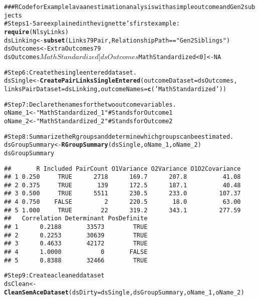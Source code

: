 \documentclass[letterpaper]{article}\usepackage{graphicx, color}
\makeatletter
\newcommand{\hlfunctioncall}[1]{\textcolor[rgb]{0.501960784313725,0,0.329411764705882}{\textbf{#1}}}%
\newcommand{\hlstring}[1]{\textcolor[rgb]{0.6,0.6,1}{#1}}%
\newcommand{\hlcomment}[1]{\textcolor[rgb]{0.180392156862745,0.6,0.341176470588235}{#1}}%
\newenvironment{kframe}{%
 \def\at@end@of@kframe{}%
 \ifinner\ifhmode%
  \def\at@end@of@kframe{\end{minipage}}%
  \begin{minipage}{\columnwidth}%
 \fi\fi%
 \def\FrameCommand##1{\hskip\@totalleftmargin \hskip-\fboxsep
 \colorbox{shadecolor}{##1}\hskip-\fboxsep
     \hskip-\linewidth \hskip-\@totalleftmargin \hskip\columnwidth}%
 \MakeFramed {\advance\hsize-\width
   \@totalleftmargin\z@ \linewidth\hsize
   \@setminipage}}%
 {\par\unskip\endMakeFramed%
 \at@end@of@kframe}
\newenvironment{knitrout}{}{} %
\makeatother
\begin{document}
\begin{knitrout}
\color{fgcolor}\begin{kframe}
\begin{alltt}
\hlcomment{### R Code for Example lavaan estimation analysis with a simple outcome and Gen2 subjects}
\hlcomment{#Steps 1-5 are explained in the vignette's first example:}
\hlfunctioncall{require}(NlsyLinks) 
dsLinking <- \hlfunctioncall{subset}(Links79Pair, RelationshipPath==\hlstring{"Gen2Siblings"})
dsOutcomes <- ExtraOutcomes79 
dsOutcomes$MathStandardized[dsOutcomes$MathStandardized < 0] <- NA

\hlcomment{#Step 6: Create the single entered dataset.}
dsSingle <- \hlfunctioncall{CreatePairLinksSingleEntered}(outcomeDataset=dsOutcomes, 
  linksPairDataset=dsLinking, outcomeNames=\hlfunctioncall{c}(\hlstring{'MathStandardized'}))

\hlcomment{#Step 7: Declare the names for the two outcome variables. }
oName_1 <- \hlstring{"MathStandardized_1"} #Stands for Outcome1
oName_2 <- \hlstring{"MathStandardized_2"} #Stands for Outcome2
  
\hlcomment{#Step 8: Summarize the R groups and determine which groups can be estimated.}
dsGroupSummary <- \hlfunctioncall{RGroupSummary}(dsSingle, oName_1, oName_2)
dsGroupSummary
\end{alltt}
\begin{verbatim}
##       R Included PairCount O1Variance O2Variance O1O2Covariance
## 1 0.250     TRUE      2718      169.7      207.8          41.08
## 2 0.375     TRUE       139      172.5      187.1          40.48
## 3 0.500     TRUE      5511      230.5      233.0         107.37
## 4 0.750    FALSE         2      220.5       18.0          63.00
## 5 1.000     TRUE        22      319.2      343.1         277.59
##   Correlation Determinant PosDefinite
## 1      0.2188       33573        TRUE
## 2      0.2253       30639        TRUE
## 3      0.4633       42172        TRUE
## 4      1.0000           0       FALSE
## 5      0.8388       32466        TRUE
\end{verbatim}
\begin{alltt}

\hlcomment{#Step 9: Create a cleaned dataset}
dsClean <- \hlfunctioncall{CleanSemAceDataset}(dsDirty=dsSingle, dsGroupSummary, oName_1, oName_2)


\end{alltt}
\end{kframe}
\end{knitrout}
\end{document}
